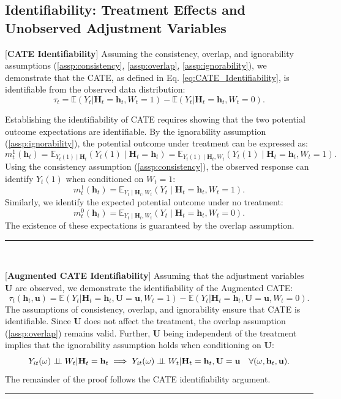 \documentclass[10pt]{article} %
\newcommand{\BlackBox}{\rule{1.5ex}{1.5ex}}  %
\renewenvironment{proof}{\par\noindent{\bf Proof\ }}{\hfill\BlackBox\\[2mm]}
\newenvironment{proof}{\par\noindent{\bf Proof\ }}{\hfill\BlackBox\\[2mm]}
\begin{document}
\subsection{Identifiability: Treatment Effects and Unobserved Adjustment Variables}
\label{appendix:proof_effect_Z}
\begin{proof}[\textbf{CATE Identifiability}]
Assuming the consistency, overlap, and ignorability assumptions (\ref{assp:consistency}, \ref{assp:overlap}, \ref{assp:ignorability}), we demonstrate that the CATE, as defined in Eq. \ref{eq:CATE_Identifiability}, is identifiable from the observed data distribution:
\begin{equation}
\tau_t = \mathbb{E}(Y_{t}| \mathbf{H}_t = \mathbf{h}_t, W_{t} = 1) - \mathbb{E}(Y_{t}| \mathbf{H}_t = \mathbf{h}_t, W_{t} = 0).
\end{equation}

Establishing the identifiability of CATE requires showing that the two potential outcome expectations are identifiable. By the ignorability assumption (\ref{assp:ignorability}), the potential outcome under treatment can be expressed as:
\[
m_{t}^{1}(\mathbf{h}_{t}) = \mathbb{E}_{Y_{t}(1) \mid \mathbf{H}_{t} }(Y_{t}(1) \mid \mathbf{H}_{t} = \mathbf{h}_{t}) = \mathbb{E}_{Y_{t}(1) \mid \mathbf{H}_{t}, W_t }(Y_{t}(1) \mid \mathbf{H}_{t} = \mathbf{h}_{t}, W_t = 1).
\]
Using the consistency assumption (\ref{assp:consistency}), the observed response can identify \( Y_{t}(1) \) when conditioned on \( W_t = 1 \):
\[
m_{t}^{1}(\mathbf{h}_{t}) = \mathbb{E}_{Y_{t} \mid \mathbf{H}_{t}, W_t }(Y_{t}\mid \mathbf{H}_{t} = \mathbf{h}_{t}, W_t = 1).
\]
Similarly, we identify the expected potential outcome under no treatment:
\[
m_{t}^{0}(\mathbf{h}_{t}) = \mathbb{E}_{Y_{t} \mid \mathbf{H}_{t}, W_t }(Y_{t}\mid \mathbf{H}_{t} = \mathbf{h}_{t}, W_t = 0).
\]
The existence of these expectations is guaranteed by the overlap assumption.
\end{proof}

\begin{proof}[\textbf{Augmented CATE Identifiability}]
\label{proof:acate_identif}
Assuming that the adjustment variables \(\mathbf{U}\) are observed, we demonstrate the identifiability of the Augmented CATE:
\[
\tau_{t}(\mathbf{h}_{t}, \mathbf{u})= \mathbb{E}(Y_{t}| \mathbf{H}_t = \mathbf{h}_t, \mathbf{U}= \mathbf{u}, W_{t} = 1) - \mathbb{E}(Y_{t}| \mathbf{H}_t = \mathbf{h}_t, \mathbf{U}= \mathbf{u}, W_{t} = 0).
\]
The assumptions of consistency, overlap, and ignorability ensure that CATE is identifiable. Since \(\mathbf{U}\) does not affect the treatment, the overlap assumption (\ref{assp:overlap}) remains valid. Further, \(\mathbf{U}\) being independent of the treatment implies that the ignorability assumption holds when conditioning on \(\mathbf{U}\):
\[
Y_{it}(\omega) \perp \!\!\! \perp W_{t}| \mathbf{H}_{t} = \mathbf{h}_{t} \implies Y_{it}(\omega) \perp \!\!\! \perp W_{t}| \mathbf{H}_{t} = \mathbf{h}_{t},\mathbf{U}= \mathbf{u} \quad \forall (\omega, \mathbf{h}_{t}, \mathbf{u}).
\]
The remainder of the proof follows the CATE identifiability argument.
\end{proof}
\end{document}
